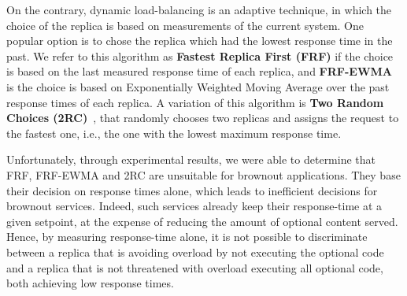 On the contrary, dynamic load-balancing is an adaptive technique, in
which the choice of the replica is based on measurements of the current system.
One popular option is to chose the replica which had the lowest response time in the past.
We refer to this algorithm as \textbf{Fastest Replica First (FRF)} if the choice is based on the last
measured response time of each replica, and \textbf{FRF-EWMA} is the choice is based on
Exponentially Weighted Moving Average over the past response times of each replica.
A variation of this algorithm is \textbf{Two Random Choices
  (2RC)}~\cite{2RC}, that randomly chooses two replicas and
assigns the request to the fastest one, i.e., the one with the lowest
maximum response time.

Unfortunately, through experimental results, we were able to determine
that FRF, FRF-EWMA and 2RC are unsuitable for brownout applications. They base
their decision on response times alone, which
leads to inefficient decisions for brownout services.  Indeed, such
services already keep their response-time at a given setpoint, at the
expense of reducing the amount of optional content served. Hence, by
measuring response-time alone, it is not possible to discriminate
between a replica that is avoiding overload by not executing the
optional code and a replica that is not threatened with overload
executing all optional code, both achieving low response times.

